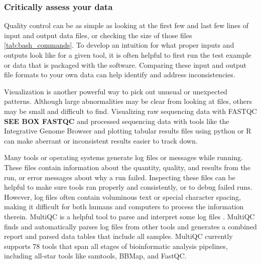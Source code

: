 \documentclass[10pt,letterpaper]{article}
\begin{document}
\subsubsection*{Critically assess your data}
Quality control can be as simple as looking at the first few and last few lines of input and output data files, or checking the size of those files {\ref{tab:bash_commands}}. 
To develop an intuition for what proper inputs and outputs look like for a given tool, it is often helpful to first run the test example or data that is packaged with the software. 
Comparing these input and output file formats to your own data can help identify and address inconsistencies. 

Visualization is another powerful way to pick out unusual or unexpected patterns. 
Although large abnormalities may be clear from looking at files, others may be small and difficult to find. 
Visualizing raw sequencing data with FASTQC \textbf{SEE BOX FASTQC} and processed sequencing data with tools like the Integrative Genome Browser and plotting tabular results files using python or R can make aberrant or inconsistent results easier to track down.

Many tools or operating systems generate log files or messages while running. 
These files contain information about the quantity, quality, and results from the run, or error messages about why a run failed. 
Inspecting these files can be helpful to make sure tools ran properly and consistently, or to debug failed runs. 
However, log files often contain voluminous text or special character spacing, making it difficult for both humans and computers to process the information therein. 
MultiQC is a helpful tool to parse and interpret some log files \cite{ewels2016}. 
MultiQC finds and automatically parses log files from other tools and generates a combined report and parsed data tables that include all samples. 
MultiQC currently supports 78 tools that span all stages of bioinformatic analysis pipelines, including all-star tools like samtools, BBMap, and FastQC. 
\end{document}
